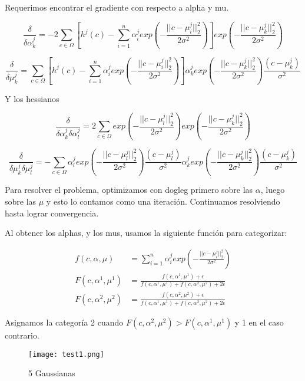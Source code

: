 \documentclass[10pt]{article}
\begin{document}
\begin{enumerate}
Requerimos encontrar el gradiente con respecto a alpha y mu.

$$ \frac{\delta}{\delta\alpha_k^j} = -2\sum_{c\in\Omega} [ h^j(c) - \sum_{i = 1}^{n} \alpha_i^j exp\left( -\frac{||c - \mu_i^j||^2_2}{2\sigma^2} \right)] exp\left( -\frac{||c - \mu_k^j||^2_2}{2\sigma^2} \right) $$


$$ \frac{\delta}{\delta\mu_k^j} = \sum_{c\in\Omega} [ h^j(c) - \sum_{i = 1}^{n} \alpha_i^j exp\left( -\frac{||c - \mu_i^j||^2_2}{2\sigma^2} \right)] \alpha_k^jexp\left( -\frac{||c - \mu_k^j||^2_2}{2\sigma^2} \right) \frac{(c - \mu_k^j)}{\sigma^2}$$

Y los hessianos

$$ \frac{\delta}{\delta\alpha_k^j \delta\alpha_l^j} = 2\sum_{c\in\Omega}  exp\left( -\frac{||c - \mu_l^j||^2_2}{2\sigma^2} \right) exp\left( -\frac{||c - \mu_k^j||^2_2}{2\sigma^2} \right) $$


$$ \frac{\delta}{\delta\mu_k^j\delta\mu_l^j} = -\sum_{c\in\Omega}  \alpha_l^j exp\left( -\frac{||c - \mu_l^j||^2_2}{2\sigma^2} \right) \frac{(c - \mu_l^j)}{\sigma^2} \alpha_k^j exp\left( -\frac{||c - \mu_k^j||^2_2}{2\sigma^2} \right) \frac{(c - \mu_k^j)}{\sigma^2}$$

Para resolver el problema, optimizamos con dogleg primero sobre las $\alpha$, luego sobre las $\mu$ y esto lo contamos como una iteración. Continuamos resolviendo hasta lograr convergencia.

Al obtener los alphas, y los mus, usamos la siguiente función para categorizar:

\begin{align*}
 f(c, \alpha, \mu) &= \sum_{i = 1}^{n} \alpha_i^j exp\left( -\frac{||c - \mu_i^j||^2_2}{2\sigma^2} \right)\\
 F(c, \alpha^1, \mu^1) &= \frac{f(c, \alpha^1, \mu^1) + \epsilon}{f(c, \alpha^1, \mu^1) + f(c, \alpha^2, \mu^2) + 2\epsilon}\\
F(c, \alpha^2, \mu^2) &= \frac{f(c, \alpha^2, \mu^2) + \epsilon}{f(c, \alpha^1, \mu^1) + f(c, \alpha^2, \mu^2) + 2\epsilon}
\end{align*}

Asignamos la categoría 2 cuando $F(c, \alpha^2, \mu^2) > F(c, \alpha^1, \mu^1)$ y 1 en el caso contrario.

\begin{figure}[ht]
    \centering
    \texttt{[image: test1.png]}
    \caption{5 Gaussianas}
    \label{fig:r2f1}
\end{figure}

\end{enumerate}
\end{document}
